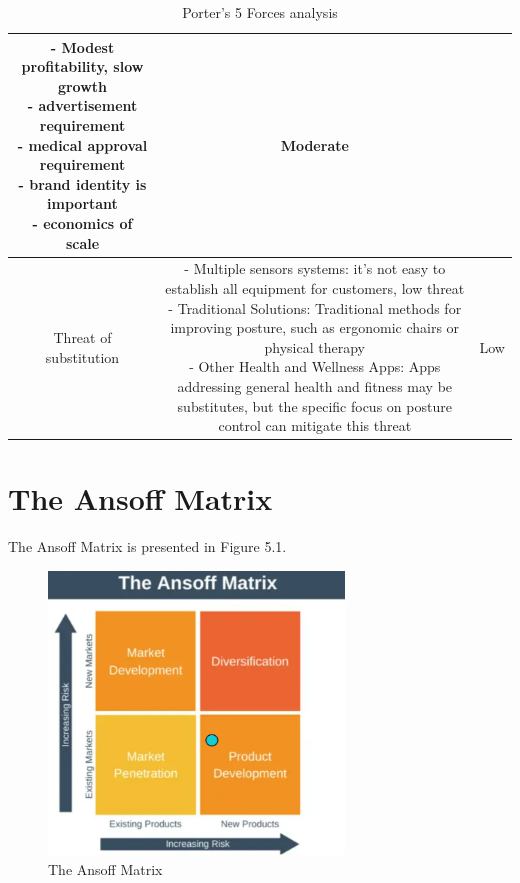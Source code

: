 \begin{table}[ht]
\begin{tabular}{|c|c|c|}
{            -	Modest profitability, slow growth\\
            -	advertisement requirement\\
            -	medical approval requirement\\
            -	brand identity is important\\
            -	economics of scale
            \vspace{5pt}
        } & Moderate \\
    \hline
        Threat of substitution &  \parbox{10cm}{\vspace{5pt}
            -	Multiple sensors systems: it's not easy to establish all equipment for customers, low threat\\
            -	Traditional Solutions: Traditional methods for improving posture, such as ergonomic chairs or physical therapy\\
            -	Other Health and Wellness Apps: Apps addressing general health and fitness may be substitutes, but the specific focus on posture control can mitigate this threat\vspace{5pt}
            \vspace{5pt}} & Low \\
    \hline
    \end{tabular}
    \caption{Porter's 5 Forces analysis}
\end{table}

\section{The Ansoff Matrix}

The Ansoff Matrix is presented in Figure 5.1.

\begin{figure}[H]
	\centering
	\includegraphics[width=0.7\textwidth]{figures/ansoff_matrix.png}
	\caption{The Ansoff Matrix}
	\label{fig:ansoff_matrix}
\end{figure}

